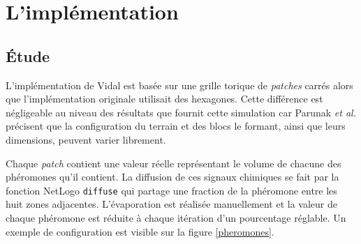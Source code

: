 \documentclass[12pt]{article}
\begin{document}
\section{L'implémentation}

\subsection{\'Etude}

L'implémentation de Vidal est basée sur une grille torique de
\textit{patches} carrés alors que l'implémentation originale utilisait
des hexagones. Cette différence est négligeable au niveau des
résultats que fournit cette simulation car Parunak \textit{et al.}
précisent que la configuration du terrain et des blocs le formant,
ainsi que leurs dimensions, peuvent varier librement.

Chaque \textit{patch} contient une valeur réelle représentant le
volume de chacune des phéromones qu'il contient. La diffusion de ces
signaux chimiques se fait par la fonction NetLogo \texttt{diffuse} qui
partage une fraction de la phéromone entre les huit zones
adjacentes. L'évaporation est réalisée manuellement et la valeur de
chaque phéromone est réduite à chaque itération d'un pourcentage
réglable. Un exemple de configuration est visible sur la figure
\ref{pheromones}.
\end{document}
